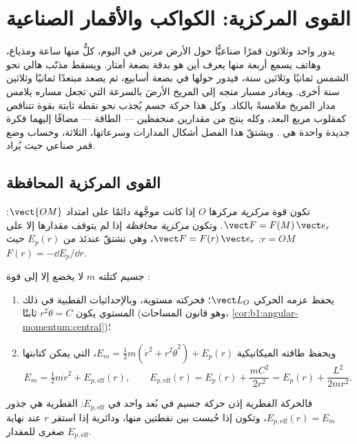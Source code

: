 \chapter{القوى المركزية: الكواكب والأقمار الصناعية}\label{ch:b1:central-forces}

يدور واحد وثلاثون قمرًا صناعيًّا حول الأرض مرتين في اليوم، كلٌّ منها ساعة
ومذياع، وهاتف يسمع أربعة منها يعرف أين هو بدقة
بضعة أمتار. ويسقط مذنّب هالي نحو الشمس ثمانيًا وثلاثين
سنة، فيدور حولها في بضعة أسابيع، ثم يصعد مبتعدًا
ثمانيًا وثلاثين سنة أخرى. ويغادر مسبار متجه إلى المريخ الأرضَ بالسرعة
التي تجعل مساره يلامس مدار المريخ ملامسةً بالكاد. وكل هذا
حركة جسم يُجذب نحو نقطة ثابتة بقوة تتناقص
كمقلوب مربع البعد، وكله ينتج
من مقدارين منحفظين --- الطاقة  --- مضافًا إليهما
فكرة جديدة واحدة هي . ويشتقّ هذا الفصل
أشكال المدارات وسرعاتها،  الثلاثة، وحساب
وضع قمر صناعي حيث يُراد.

\section{القوى المركزية المحافظة}

\begin{definition}\label{def:b1:central-forces:central}
تكون قوة \emph{مركزية} مركزها $O$ إذا كانت موجَّهة دائمًا
على امتداد $\vect{OM}$: $\vect F = F(M)\,\vect e_r$. وتكون \emph{مركزية
محافظة} إذا لم يتوقف مقدارها إلا على $r = OM$: $\vect F =
F(r)\,\vect e_r$، وهي تشتقّ عندئذ من  $E_p(r)$ حيث
$F(r) = -\dd E_p/\dd r$.
\end{definition}

\begin{theorem}\label{thm:b1:central-forces:reduction}
جسيم كتلته $m$ لا يخضع إلا إلى قوة :
\begin{enumerate}
  \item يحفظ عزمه الحركي $\vect L_O$؛ فحركته مستوية،
        وبالإحداثيات القطبية في ذلك المستوي يكون $r^2\dot\theta = C$
        ثابتًا (وهو قانون المساحات، \cref{cor:b1:angular-momentum:central})؛
  \item ويحفظ طاقته الميكانيكية $E_m = \tfrac12 m(\dot r^2 + r^2\dot\theta^2)
        + E_p(r)$، التي يمكن كتابتها
        \[
        E_m = \tfrac12 m\dot r^2 + E_{p,\mathrm{eff}}(r), \qquad
        E_{p,\mathrm{eff}}(r) = E_p(r) + \frac{mC^2}{2r^2} = E_p(r) + \frac{L^2}{2mr^2} .
        \]
\end{enumerate}
فالحركة القطرية إذن حركة جسيم في بُعد واحد في
\emph{} $E_{p,\mathrm{eff}}$: 
القطرية هي جذور $E_{p,\mathrm{eff}}(r) = E_m$، وتكون  إذا حُبست بين نقطتين منها، ودائرية إذا استقر $r$ عند
نهاية صغرى للمقدار $E_{p,\mathrm{eff}}$.
\end{theorem}

